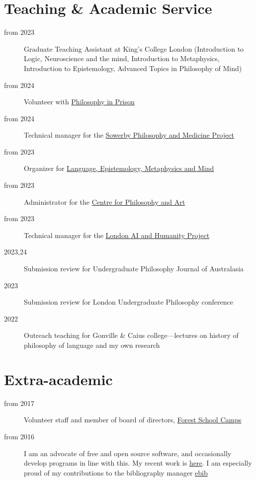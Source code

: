 \documentclass{cv}
\begin{document}
\section*{Teaching \& Academic Service}
\label{sec:orgaf05ee3}
\begin{description}
\item[{from 2023}] Graduate Teaching Assistant at King's College London
(Introduction to Logic, Neuroscience and the mind, Introduction to
Metaphysics, Introduction to Epistemology, Advanced Topics in
Philosophy of Mind)
\item[{from 2024}] Volunteer with \href{https:\slash{}\slash{}www.philosophyinprison.com\slash{}}{Philosophy in Prison}
\item[{from 2024}] Technical manager for the \href{https:\slash{}\slash{}www.philosophyandmedicine.org\slash{}}{Sowerby Philosophy and
Medicine Project}
\item[{from 2023}] Organizer for \href{https:\slash{}\slash{}www.lemm-london.co.uk\slash{}}{Language, Epistemology, Metaphysics and Mind}
\item[{from 2023}] Administrator for the \href{https:\slash{}\slash{}philosophyarts.co.uk\slash{}}{Centre for Philosophy and Art}
\item[{from 2023}] Technical manager for the \href{https:\slash{}\slash{}www.ai-humanity-london.com\slash{}}{London AI and Humanity Project}
\item[{2023,24}] Submission review for Undergraduate Philosophy Journal of
Australasia
\item[{2023}] Submission review for London Undergraduate Philosophy
conference
\item[{2022}] Outreach teaching for Gonville \& Caius college---lectures on
history of philosophy of language and my own research
\end{description}

\section*{Extra-academic}
\label{sec:org24befa6}
\begin{description}
\item[{from 2017}] Volunteer staff and member of board of directors,
\href{https:\slash{}\slash{}www.fsc.org.uk\slash{}}{Forest School Camps}
\item[{from 2016}] I am an advocate of free and open source software, and
occasionally develop programs in line with this. My recent work is
\href{https:\slash{}\slash{}github.com\slash{}Hugo-Heagren}{here}. I am especially proud of my contributions to the bibliography
manager \href{https:\slash{}\slash{}joostkremers.github.io\slash{}ebib\slash{}}{ebib}
\end{description}
\end{document}
